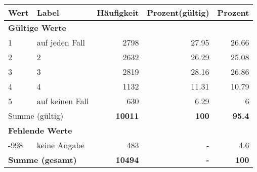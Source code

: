     \begin{longtable}{lXrrr}
     \toprule
     \textbf{Wert} & \textbf{Label} & \textbf{Häufigkeit} & \textbf{Prozent(gültig)} & \textbf{Prozent} \\
     \endhead
     \midrule
     \multicolumn{5}{l}{\textbf{Gültige Werte}}\\

     1 &
     \multicolumn{1}{X}{ auf jeden Fall   } &


       \num{2798} &
       \num[round-mode=places,round-precision=2]{27,95} &
         \num[round-mode=places,round-precision=2]{26,66} \\

     2 &
     \multicolumn{1}{X}{ 2   } &


       \num{2632} &
       \num[round-mode=places,round-precision=2]{26,29} &
         \num[round-mode=places,round-precision=2]{25,08} \\

     3 &
     \multicolumn{1}{X}{ 3   } &


       \num{2819} &
       \num[round-mode=places,round-precision=2]{28,16} &
         \num[round-mode=places,round-precision=2]{26,86} \\

     4 &
     \multicolumn{1}{X}{ 4   } &


       \num{1132} &
       \num[round-mode=places,round-precision=2]{11,31} &
         \num[round-mode=places,round-precision=2]{10,79} \\

     5 &
     \multicolumn{1}{X}{ auf keinen Fall   } &


       \num{630} &
       \num[round-mode=places,round-precision=2]{6,29} &
         \num[round-mode=places,round-precision=2]{6} \\
     \midrule
     \multicolumn{2}{l}{Summe (gültig)} &
       \textbf{\num{10011}} &
     \textbf{100} &
       \textbf{\num[round-mode=places,round-precision=2]{95,4}} \\
     \multicolumn{5}{l}{\textbf{Fehlende Werte}}\\
       -998 &
       keine Angabe &
         \num{483} &
        - &
         \num[round-mode=places,round-precision=2]{4,6} \\
     \midrule
     \multicolumn{2}{l}{\textbf{Summe (gesamt)}} &
          \textbf{\num{10494}} &
        \textbf{-} &
        \textbf{100} \\
     \bottomrule
     \end{longtable}
     
